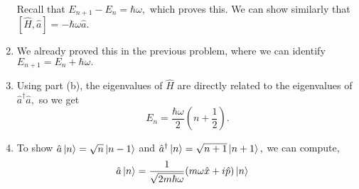 \documentclass{article}
\numberwithin{equation}{section}
\begin{document}
\begin{problem}[3.3.1]
\begin{enumerate}[label=(\alph*)]
\begin{align*}
        \end{align*}
        Recall that $E_{n+1} - E_n  = \hbar\omega,$ which proves this. We can show similarly that $[\hat{H},\hat{a}]=-\hbar\omega\hat{a}.$
        \item We already proved this in the previous problem, where we can identify $E_{n+1} = E_n + \hbar\omega.$
        \item Using part (b), the eigenvalues of $\hat{H}$ are directly related to the eigenvalues of $\hat{a}^\dagger\hat{a},$ so we get 
        \begin{equation*}
            E_n = \frac{\hbar\omega}{2}\left(n+\frac{1}{2}\right).
        \end{equation*}
        \item To show $\hat{a}\ket{n} = \sqrt{n}\ket{n-1}$ and $\hat{a}^\dagger\ket{n} = \sqrt{n+1}\ket{n+1},$ we can compute,
        \begin{align*}
            \hat{a}\ket{n} &= \frac{1}{\sqrt{2m\hbar\omega}}(m\omega\hat{x}+i\hat{p})\ket{n }
        \end{align*}
    \end{enumerate}
\end{problem}
\end{document}
